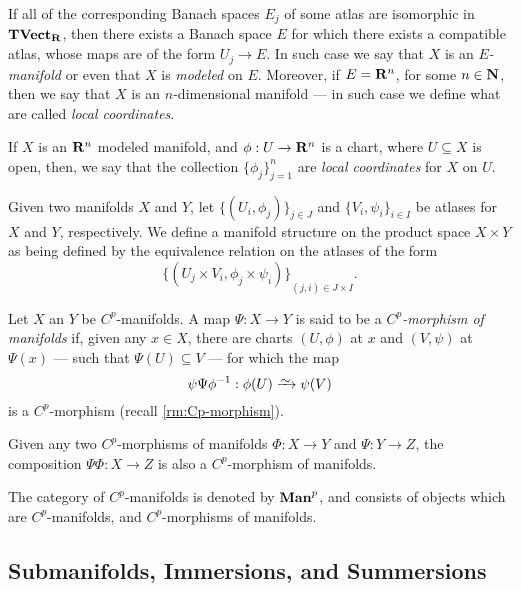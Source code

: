If all of the corresponding Banach spaces \(E_j\) of some atlas are isomorphic
in \({\textbf{TVect}}_{\mathbf{R}}\), then there exists a Banach space \(E\) for which there
exists a compatible atlas, whose maps are of the form \(U_j \to E\). In such
case we say that \(X\) is an \emph{\(E\)-manifold} or even that \(X\) is
\emph{modeled} on \(E\). Moreover, if \(E = \mathbf{R}^n\), for some \(n \in \mathbf{N}\), then
we say that \(X\) is an \(n\)-dimensional manifold --- in such case we define
what are called \emph{local coordinates}.

\begin{definition}
\label{def:local-coordinates}
If \(X\) is an \(\mathbf{R}^n\) modeled manifold, and \(\phi: U \to \mathbf{R}^n\) is a chart,
where \(U \subseteq X\) is open, then, we say that the collection
\(\{\phi_{j}\}_{j=1}^n\) are \emph{local coordinates} for \(X\) on \(U\).
\end{definition}

\begin{definition}
\label{def:product-Cp-manifold}
Given two manifolds \(X\) and \(Y\), let \(\{(U_{i}, \phi_j)\}_{j \in J}\) and
\(\{V_{i}, \psi_{i}\}_{i \in I}\) be atlases for \(X\) and \(Y\), respectively.
We define a manifold structure on the product space \(X \times Y\) as being
defined by the equivalence relation on the atlases of the form
\[
  {\{(U_{j} \times V_{i}, \phi_j \times \psi_i)\}}_{(j, i) \in J \times I}.
\]
\end{definition}

\begin{definition}
\label{def:morphism-manifolds}
Let \(X\) an \(Y\) be \(C^p\)-manifolds. A map \(\Psi: X \to Y\) is said to be a
\emph{\(C^p\)-morphism of manifolds} if, given any \(x \in X\), there are charts
\((U, \phi)\) at \(x\) and \((V, \psi)\) at \(\Psi(x)\) --- such that \(\Psi(U)
\subseteq V\) --- for which the map
\[
  \psi \Psi \phi^{-1}: \phi(U) \isoto \psi(V)
\]
is a \(C^p\)-morphism (recall \cref{rm:Cp-morphism}).
\end{definition}

\begin{corollary}
\label{cor:composition-Cp-morphisms}
Given any two \(C^p\)-morphisms of manifolds \(\Phi: X \to Y\) and \(\Psi: Y \to
Z\), the composition \(\Psi \Phi: X \to Z\) is also a \(C^p\)-morphism of
manifolds.
\end{corollary}

\begin{definition}
\label{def:Cp-manifold-category}
The category of \(C^p\)-manifolds is denoted by \({\textbf{Man}}^p\), and consists of
objects which are \(C^p\)-manifolds, and \(C^p\)-morphisms of manifolds.
\end{definition}

\subsection{Submanifolds, Immersions, and Summersions}


